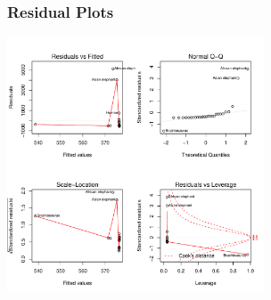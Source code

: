 \documentclass[handout]{beamer}
\begin{document}
  \begin{frame}
    \frametitle{Residual Plots}

\centerline{\includegraphics[height=3in]{brains-resid}}
  \end{frame}
\end{document}
